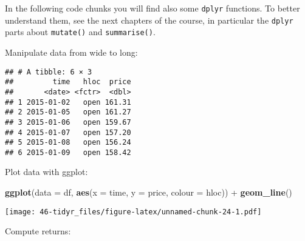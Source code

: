\documentclass[]{book}
\newenvironment{Shaded}{\begin{snugshade}}{\end{snugshade}}
\newcommand{\KeywordTok}[1]{\textcolor[rgb]{0.13,0.29,0.53}{\textbf{{#1}}}}
\newcommand{\DataTypeTok}[1]{\textcolor[rgb]{0.13,0.29,0.53}{{#1}}}
\newcommand{\StringTok}[1]{\textcolor[rgb]{0.31,0.60,0.02}{{#1}}}
\newcommand{\NormalTok}[1]{{#1}}
\begin{document}
In the following code chunks you will find also some \texttt{dplyr}
functions. To better understand them, see the next chapters of the
course, in particular the \texttt{dplyr} parts about \texttt{mutate()}
and \texttt{summarise()}.

Manipulate data from wide to long:

\begin{Shaded}
\end{Shaded}

\begin{verbatim}
## # A tibble: 6 × 3
##         time   hloc  price
##       <date> <fctr>  <dbl>
## 1 2015-01-02   open 161.31
## 2 2015-01-05   open 161.27
## 3 2015-01-06   open 159.67
## 4 2015-01-07   open 157.20
## 5 2015-01-08   open 156.24
## 6 2015-01-09   open 158.42
\end{verbatim}

Plot data with ggplot:

\begin{Shaded}
\begin{Highlighting}[]
\KeywordTok{ggplot}\NormalTok{(}\DataTypeTok{data =} \NormalTok{df, }\KeywordTok{aes}\NormalTok{(}\DataTypeTok{x =} \NormalTok{time, }\DataTypeTok{y =} \NormalTok{price, }\DataTypeTok{colour =} \NormalTok{hloc)) +}\StringTok{ }\KeywordTok{geom_line}\NormalTok{() }
\end{Highlighting}
\end{Shaded}

\texttt{[image: 46-tidyr\_files/figure-latex/unnamed-chunk-24-1.pdf]}

Compute returns:

\begin{Shaded}
\end{Shaded}
\end{document}
